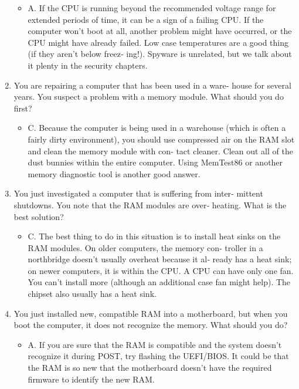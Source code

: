 \documentclass{article}
\begin{document}
\begin{enumerate}
    \begin{itemize}
        \item A. If the CPU is running beyond the recommended voltage
range for extended periods of time, it can be a sign of a failing
CPU. If the computer won’t boot at all, another problem might
have occurred, or the CPU might have already failed. Low
case temperatures are a good thing (if they aren’t below freez‐
ing!). Spyware is unrelated, but we talk about it plenty in the
security chapters.
    \end{itemize}
    \item You are repairing a computer that has been used in a ware‐
house for several years. You suspect a problem with a memory
module. What should you do first?
    \begin{itemize}
        \item C. Because the computer is being used in a warehouse (which
is often a fairly dirty environment), you should use compressed
air on the RAM slot and clean the memory module with con‐
tact cleaner. Clean out all of the dust bunnies within the entire
computer. Using MemTest86 or another memory diagnostic
tool is another good answer.
    \end{itemize}
    \item You just investigated a computer that is suffering from inter‐
mittent shutdowns. You note that the RAM modules are over‐
heating. What is the best solution?
    \begin{itemize}
        \item C. The best thing to do in this situation is to install heat sinks
on the RAM modules. On older computers, the memory con‐
troller in a northbridge doesn’t usually overheat because it al‐
ready has a heat sink; on newer computers, it is within the
CPU. A CPU can have only one fan. You can’t install more
(although an additional case fan might help). The chipset also
usually has a heat sink.
    \end{itemize}
    \item You just installed new, compatible RAM into a motherboard,
but when you boot the computer, it does not recognize the
memory. What should you do?
    \begin{itemize}
        \item A. If you are sure that the RAM is compatible and the system doesn’t recognize it during POST, try flashing the UEFI/BIOS.
It could be that the RAM is so new that the motherboard
doesn’t have the required firmware to identify the new RAM.
    \end{itemize}

\end{enumerate}
\end{document}
